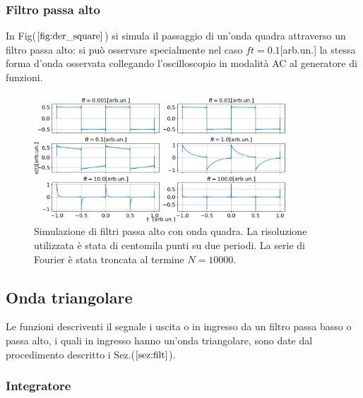 \documentclass{article}
\begin{document}
            \subsubsection{Filtro passa alto}
                In Fig($\ref{fig:der_square}$) si simula il passaggio di un'onda quadra
                attraverso un filtro passa alto: si  può osservare specialmente 
                nel caso $ft=0.1$[arb.un.] la stessa forma d'onda osservata collegando 
                l'oscilloscopio in modalità AC al generatore di funzioni.
                    \begin{figure}[H]
                        \centering
                        \includegraphics[width=0.85\textwidth]{der_square.png} %
                        \caption{Simulazione di filtri passa alto con onda quadra.
                        La risoluzione utilizzata è stata di centomila punti su due periodi.
                        La serie di Fourier è stata troncata al termine $N=10000$.}
                        \label{fig:der_square}
                    \end{figure}


    \subsection{Onda triangolare}
    Le funzioni descriventi il segnale i uscita o in ingresso da un filtro passa basso
    o passa alto, i quali in ingresso hanno un'onda triangolare, 
    sono date dal procedimento descritto i Sez.($\ref{sez:filt}$).
        \subsubsection{Integratore}
            
\end{document}
